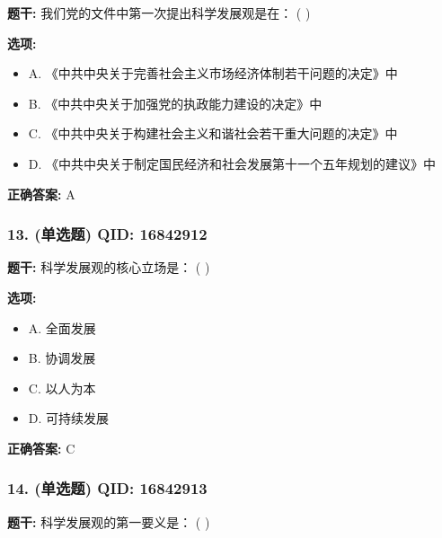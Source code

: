 \documentclass[12pt,UTF8]{ctexart}
\begin{document}
\textbf{题干:}
我们党的文件中第一次提出科学发展观是在： ( )

\textbf{选项:}
\begin{itemize}[leftmargin=*]

  \item A. 《中共中央关于完善社会主义市场经济体制若干问题的决定》中

  \item B. 《中共中央关于加强党的执政能力建设的决定》中

  \item C. 《中共中央关于构建社会主义和谐社会若干重大问题的决定》中

  \item D. 《中共中央关于制定国民经济和社会发展第十一个五年规划的建议》中

\end{itemize}

\textbf{正确答案:}
A

\vspace{0.3em}\hrulefill\vspace{0.7em}

\subsubsection*{13. (单选题) \small QID: 16842912}

\textbf{题干:}
科学发展观的核心立场是： ( )

\textbf{选项:}
\begin{itemize}[leftmargin=*]

  \item A. 全面发展

  \item B. 协调发展

  \item C. 以人为本

  \item D. 可持续发展

\end{itemize}

\textbf{正确答案:}
C

\vspace{0.3em}\hrulefill\vspace{0.7em}

\subsubsection*{14. (单选题) \small QID: 16842913}

\textbf{题干:}
科学发展观的第一要义是： ( )
\end{document}

